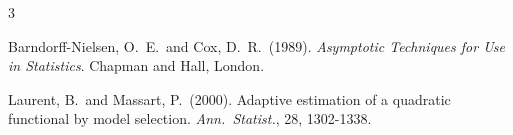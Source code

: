 \documentclass[10pt, reqno]{amsart}
\numberwithin{equation}{section}
\begin{document}
\begin{appendix}

\begin{thebibliography}{3}
	
	Barndorff-Nielsen, O.~E.~and Cox, D.~R.~(1989). \emph{Asymptotic Techniques for Use in Statistics}. Chapman and Hall, London. 
	
	Laurent, B.~and Massart, P.~(2000). Adaptive estimation of a quadratic functional by model selection. \textit{Ann.~Statist.}, 28, 1302-1338.
	
	
\end{thebibliography}

\end{appendix}

\bigskip\bigskip
\bigskip\bigskip
\bigskip\bigskip
\end{document}
